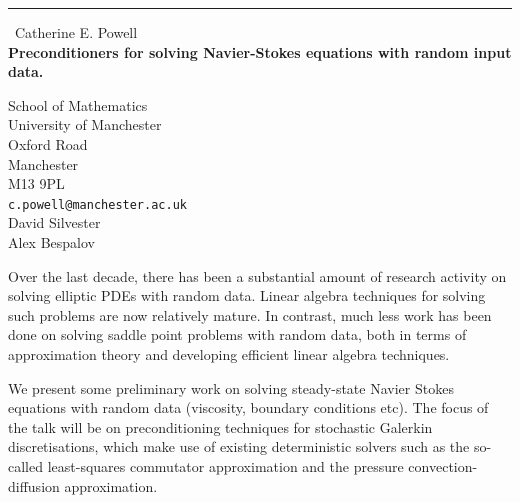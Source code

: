 \documentclass{report}
\begin{document}
\begin{center}
\rule{6in}{1pt} \
{\large Catherine E. Powell \\
{\bf Preconditioners for solving Navier-Stokes equations with random input data.}}

School of Mathematics \\ University of Manchester \\ Oxford Road \\ Manchester \\ M13 9PL
\\
{\tt c.powell@manchester.ac.uk}\\
David  Silvester\\
Alex Bespalov\end{center}

Over the last decade, there has been a substantial amount of research
activity on solving elliptic PDEs with random data. Linear algebra
techniques for solving such problems are now relatively mature. In
contrast, much less work has been done on solving saddle point problems
with random data, both in terms of approximation theory and developing
efficient linear algebra techniques.

We present some preliminary work on solving steady-state Navier Stokes
equations with random data (viscosity, boundary conditions etc). The
focus of the talk will be on preconditioning techniques for stochastic
Galerkin discretisations, which make use of existing deterministic
solvers such as the so-called least-squares commutator approximation and
the pressure convection-diffusion approximation.
\end{document}

